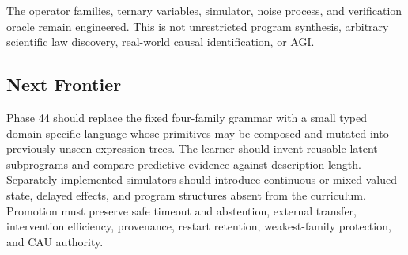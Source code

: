 The operator families, ternary variables, simulator, noise process, and
verification oracle remain engineered. This is not unrestricted program
synthesis, arbitrary scientific law discovery, real-world causal
identification, or AGI.

\subsection{Next Frontier}

Phase 44 should replace the fixed four-family grammar with a small typed
domain-specific language whose primitives may be composed and mutated into
previously unseen expression trees. The learner should invent reusable latent
subprograms and compare predictive evidence against description length.
Separately implemented simulators should introduce continuous or mixed-valued
state, delayed effects, and program structures absent from the curriculum.
Promotion must preserve safe timeout and abstention, external transfer,
intervention efficiency, provenance, restart retention, weakest-family
protection, and CAU authority.
